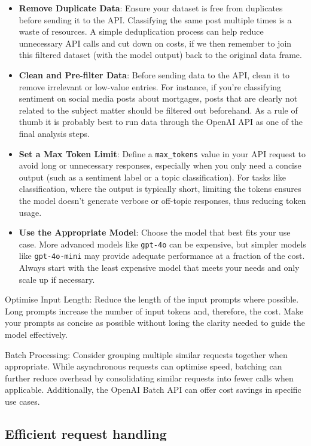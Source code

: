 \documentclass[
  letterpaper,
  DIV=11,
  numbers=noendperiod]{scrreprt}
\begin{document}
\begin{itemize}
\item
  \textbf{Remove Duplicate Data}: Ensure your dataset is free from
  duplicates before sending it to the API. Classifying the same post
  multiple times is a waste of resources. A simple deduplication process
  can help reduce unnecessary API calls and cut down on costs, if we
  then remember to join this filtered dataset (with the model output)
  back to the original data frame.
\item
  \textbf{Clean and Pre-filter Data}: Before sending data to the API,
  clean it to remove irrelevant or low-value entries. For instance, if
  you're classifying sentiment on social media posts about mortgages,
  posts that are clearly not related to the subject matter should be
  filtered out beforehand. As a rule of thumb it is probably best to run
  data through the OpenAI API as one of the final analysis steps.
\item
  \textbf{Set a Max Token Limit}: Define a \texttt{max\_tokens} value in
  your API request to avoid long or unnecessary responses, especially
  when you only need a concise output (such as a sentiment label or a
  topic classification). For tasks like classification, where the output
  is typically short, limiting the tokens ensures the model doesn't
  generate verbose or off-topic responses, thus reducing token usage.
\item
  \textbf{Use the Appropriate Model}: Choose the model that best fits
  your use case. More advanced models like \texttt{gpt-4o} can be
  expensive, but simpler models like \texttt{gpt-4o-mini} may provide
  adequate performance at a fraction of the cost. Always start with the
  least expensive model that meets your needs and only scale up if
  necessary.
\end{itemize}

Optimise Input Length: Reduce the length of the input prompts where
possible. Long prompts increase the number of input tokens and,
therefore, the cost. Make your prompts as concise as possible without
losing the clarity needed to guide the model effectively.

Batch Processing: Consider grouping multiple similar requests together
when appropriate. While asynchronous requests can optimise speed,
batching can further reduce overhead by consolidating similar requests
into fewer calls when applicable. Additionally, the OpenAI Batch API can
offer cost savings in specific use cases.

\subsection{Efficient request
handling}\label{efficient-request-handling}
\end{document}
